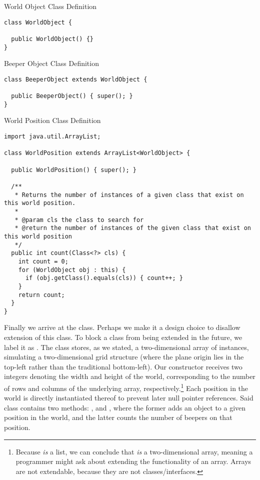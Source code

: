 \begin{cl}{World Object Class Definition}
\begin{lstlisting}[language=MyJava]
class WorldObject {

  public WorldObject() {}
}
\end{lstlisting}
\end{cl}

\begin{cl}{Beeper Object Class Definition}
\begin{lstlisting}[language=MyJava]
class BeeperObject extends WorldObject {

  public BeeperObject() { super(); }
}
\end{lstlisting}
\end{cl}

\begin{cl}{World Position Class Definition}
\begin{lstlisting}[language=MyJava]
import java.util.ArrayList;

class WorldPosition extends ArrayList<WorldObject> {

  public WorldPosition() { super(); }

  /**
   * Returns the number of instances of a given class that exist on this world position.
   *
   * @param cls the class to search for
   * @return the number of instances of the given class that exist on this world position
   */
  public int count(Class<?> cls) {
    int count = 0;
    for (WorldObject obj : this) {
      if (obj.getClass().equals(cls)) { count++; }
    }
    return count;
  }
}
\end{lstlisting}
\end{cl}

Finally we arrive at the  class. Perhaps we make it a design choice to disallow extension of this class. To block a class from being extended in the future, we label it as . The  class stores, as we stated, a two-dimensional array of  instances, simulating a two-dimensional grid structure (where the plane origin lies in the top-left rather than the traditional bottom-left). Our constructor receives two integers denoting the width and height of the world, corresponding to the number of rows and columns of the underlying array, respectively.\footnote{Because  \textit{is} a list, we can conclude that  \textit{is} a two-dimensional array, meaning a programmer might ask about extending the functionality of an array. Arrays are not extendable, because they are not classes/interfaces.} Each position in the world is directly instantiated thereof to prevent later null pointer references. Said  class contains two methods: , and , where the former adds an object to a given position in the world, and the latter counts the number of beepers on that position.

